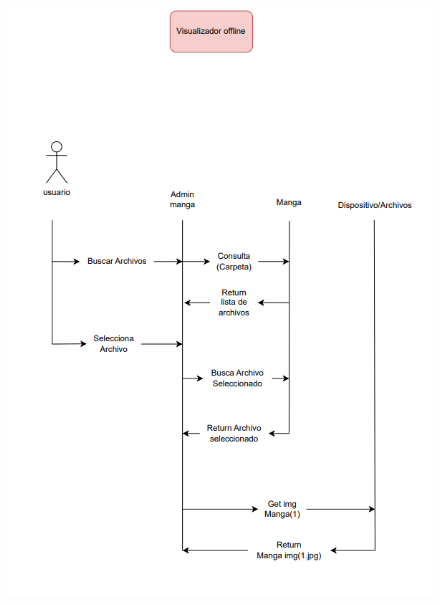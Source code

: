 \documentclass[12pt]{article}
\begin{document}
\begin{figure}[htbp]
	\centering
		\includegraphics[width=1.00\textwidth]{Screenshot 2023-10-05 114426.png}
	\label{fig:Screenshot 2023-10-05 114426}
\end{figure}
\end{document}

